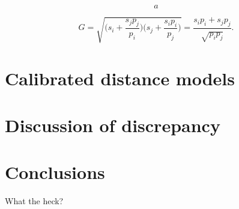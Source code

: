 \documentclass{article}
\begin{document}
\begin{equation}
  a
\end{equation}

\begin{equation}
\label{eq:g_def}
  G = \sqrt{ \bigg( s_i + \frac{s_j p_j}{p_i} \bigg)
             \bigg( s_j + \frac{s_i p_i}{p_j} \bigg)
           }
    = \frac{s_i p_i + s_j p_j}{\sqrt{p_i p_j}}.
\end{equation}

\section{Calibrated distance models}
\label{sec:disproof}

\section{Discussion of discrepancy}

\section{Conclusions}
What the heck?



\end{document}
